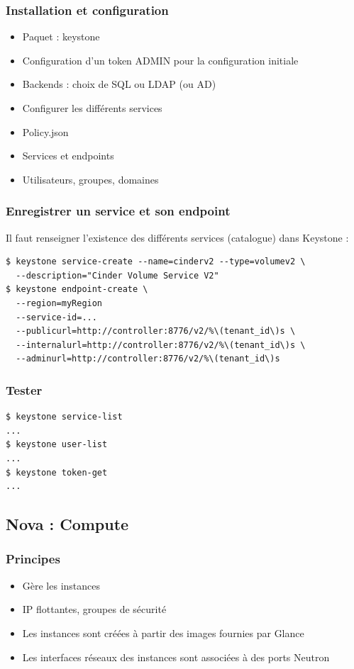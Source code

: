   \begin{frame}
    \frametitle{Installation et configuration}
    \begin{itemize}
      \item Paquet : keystone
      \item Configuration d'un token ADMIN pour la configuration initiale
      \item Backends : choix de SQL ou LDAP (ou AD)
      \item Configurer les différents services
      \item Policy.json
      \item Services et endpoints
      \item Utilisateurs, groupes, domaines
    \end{itemize}
  \end{frame}

  \begin{frame}[containsverbatim]
    \frametitle{Enregistrer un service et son endpoint}
    Il faut renseigner l'existence des différents services (catalogue) dans Keystone :
    \begin{verbatim}
$ keystone service-create --name=cinderv2 --type=volumev2 \
  --description="Cinder Volume Service V2"
$ keystone endpoint-create \
  --region=myRegion
  --service-id=...
  --publicurl=http://controller:8776/v2/%\(tenant_id\)s \
  --internalurl=http://controller:8776/v2/%\(tenant_id\)s \
  --adminurl=http://controller:8776/v2/%\(tenant_id\)s
    \end{verbatim}
  \end{frame}

  \begin{frame}[containsverbatim]
    \frametitle{Tester}
\begin{verbatim}
$ keystone service-list
...
$ keystone user-list
...
$ keystone token-get
...
\end{verbatim}
  \end{frame}

  \subsection[Nova]{Nova : Compute}

  \begin{frame}
    \frametitle{Principes}
    \begin{itemize}
      \item Gère les instances
      \item IP flottantes, groupes de sécurité
      \item Les instances sont créées à partir des images fournies par Glance
      \item Les interfaces réseaux des instances sont associées à des ports Neutron
    \end{itemize}
  \end{frame}

